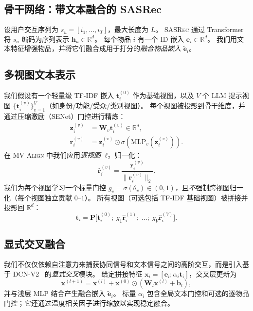 \documentclass[sigconf,natbib=true]{acmart}
\newcommand{\model}{\textsc{MV-Align}\xspace}
\newcommand{\base}{\textsc{SASRec}\xspace}
\newcommand{\tfidf}{\textsc{TF-IDF}\xspace}
\newcommand{\llm}{\textsc{LLM}\xspace}
\begin{document}
\subsection{骨干网络：带文本融合的 SASRec}
设用户交互序列为 $s_u = [i_1,\dots,i_T]$，最大长度为 $L$。
\base 通过 Transformer 将 $s_u$ 编码为序列表示 $\mathbf{h}_u \in \mathbb{R}^d$。
每个物品 $i$ 有一个 ID 嵌入 $\mathbf{e}_i \in \mathbb{R}^d$。
我们用文本特征增强物品，并将它们融合成用于打分的\emph{融合物品嵌入} $\tilde{\mathbf{e}}_i$。

\subsection{多视图文本表示}
我们假设有一个轻量级 \tfidf 嵌入 $\mathbf{t}_i^{(0)}$ 作为基础视图，以及 $V$ 个 \llm 提示视图 $\{\mathbf{t}_i^{(v)}\}_{v=1}^V$（如身份/功能/受众/类别视图）。
每个视图被投影到骨干维度，并通过压缩激励（SENet）门控进行精炼：
\begin{align}
  \mathbf{z}_i^{(v)} &= \mathbf{W}_v \mathbf{t}_i^{(v)} \in \mathbb{R}^d,\\
  \mathbf{r}_i^{(v)} &= \mathbf{z}_i^{(v)} \odot \sigma(\mathrm{MLP}_v(\mathbf{z}_i^{(v)})).
\end{align}
在 \model 中我们应用\emph{逐视图} $\ell_2$ 归一化：
\begin{equation}
  \hat{\mathbf{r}}_i^{(v)} = \frac{\mathbf{r}_i^{(v)}}{\lVert \mathbf{r}_i^{(v)} \rVert_2}.
\end{equation}
我们为每个视图学习一个标量门控 $g_v=\sigma(\theta_v)\in(0,1)$，且\emph{不}强制跨视图归一化（每个视图独立贡献 $0$--$1$）。
所有视图（可选包括 \tfidf 基础视图）被拼接并投影回 $\mathbb{R}^d$：
\begin{equation}
  \mathbf{t}_i = \mathbf{P}\Big[\mathbf{t}_i^{(0)};\; g_1\hat{\mathbf{r}}_i^{(1)};\; \dots;\; g_V\hat{\mathbf{r}}_i^{(V)}\Big].
\end{equation}

\subsection{显式交叉融合}
我们不仅仅依赖自注意力来捕获协同信号和文本信号之间的高阶交互，而是引入基于 DCN-V2~\cite{wang2021dcnv2} 的\emph{显式交叉}模块。
给定拼接特征 $\mathbf{x}_i=[\mathbf{e}_i;\alpha_i \mathbf{t}_i]$，交叉层更新为
\begin{equation}
  \mathbf{x}^{(l+1)} = \mathbf{x}^{(l)} + \mathbf{x}^{(0)} \odot (\mathbf{W}_l\mathbf{x}^{(l)} + \mathbf{b}_l),
\end{equation}
并与浅层 MLP 结合产生融合嵌入 $\tilde{\mathbf{e}}_i$。
标量 $\alpha_i$ 包含全局文本门控和可选的逐物品门控；它还通过温度相关因子进行缩放以实现稳定融合。
\end{document}

